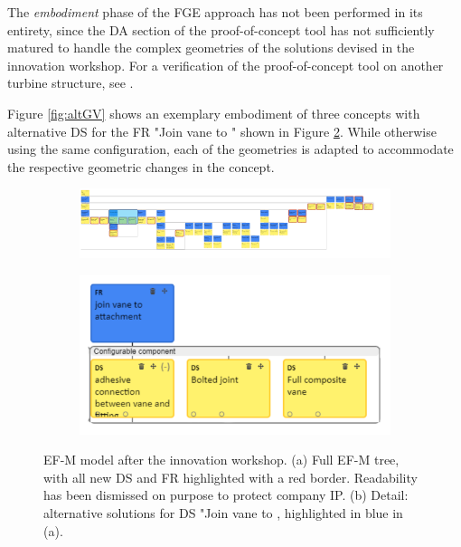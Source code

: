 \documentclass[aerospace,article,submit,moreauthors,pdftex]{Definitions/mdpi}
\newcommand{\revision}[1]{\color{black}{#1 }\color{black}}
\begin{document}
The \textit{embodiment} phase of the \ac{FGE} approach has not been performed in its entirety, since the \ac{DA} section of the proof-of-concept tool has not sufficiently matured to handle the complex geometries of the solutions devised in the innovation workshop. For a verification of the proof-of-concept tool on another turbine structure, see \citep{Muller2021FunctionVariants}.


Figure \ref{fig:altGV} shows an exemplary embodiment of three concepts with alternative DS for the FR "Join vane to \revision{attachment}" shown in Figure \ref{fig:efmAltFoot}.
While otherwise using the same configuration, each of the geometries is adapted to accommodate the respective geometric changes in the concept.

\begin{figure}[ht]
    \centering
    
        \begin{subfigure}[b]{0.6\textwidth}
            \centering
            \includegraphics[width=\textwidth]{figures/pdf/fullEFM.pdf}
            \caption{}
            \label{fig:fullEFM}
        \end{subfigure}
        \hfill
        \begin{subfigure}[b]{0.35\textwidth}
            \centering
            \includegraphics[width=\textwidth]{figures/pdf/efmDetail.pdf}
            \caption{}
            \label{fig:efmAltFoot}
        \end{subfigure}
        
    \caption{EF-M model after the innovation workshop.
    (a) Full EF-M tree, with all new DS and FR highlighted with a red border.
     Readability has been dismissed on purpose to protect company IP.
    (b) Detail: alternative solutions for DS "Join vane to \revision{attachment"}, highlighted in blue in (a).}
    \label{fig:efmResults}
\end{figure}
\end{document}
